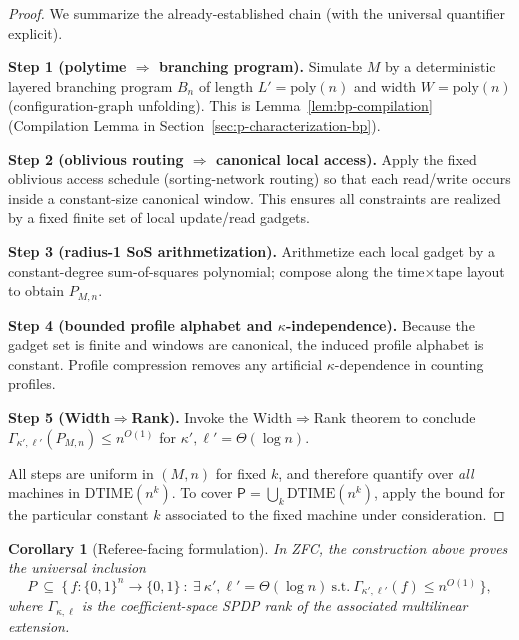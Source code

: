 \documentclass[12pt]{article}
\newcommand{\poly}{\mathrm{poly}}
\newtheorem{corollary}[theorem]{Corollary}
\theoremstyle{definition}
\theoremstyle{definition}
\theoremstyle{remark}
\theoremstyle{remark}
\begin{document}
\begin{proof}
We summarize the already-established chain (with the universal quantifier explicit).

\textbf{Step 1 (polytime $\Rightarrow$ branching program).}
Simulate $M$ by a deterministic layered branching program $B_n$ of length $L'=\poly(n)$
and width $W=\poly(n)$ (configuration-graph unfolding). This is Lemma~\ref{lem:bp-compilation}
(Compilation Lemma in Section~\ref{sec:p-characterization-bp}).

\textbf{Step 2 (oblivious routing $\Rightarrow$ canonical local access).}
Apply the fixed oblivious access schedule (sorting-network routing) so that each read/write
occurs inside a constant-size canonical window. This ensures all constraints are realized
by a fixed finite set of local update/read gadgets.

\textbf{Step 3 (radius-1 SoS arithmetization).}
Arithmetize each local gadget by a constant-degree sum-of-squares polynomial; compose along
the time$\times$tape layout to obtain $P_{M,n}$.

\textbf{Step 4 (bounded profile alphabet and $\kappa$-independence).}
Because the gadget set is finite and windows are canonical, the induced profile alphabet is
constant. Profile compression removes any artificial $\kappa$-dependence in counting profiles.

\textbf{Step 5 (Width$\Rightarrow$Rank).}
Invoke the Width$\Rightarrow$Rank theorem to conclude
$\Gamma_{\kappa',\ell'}(P_{M,n})\le n^{O(1)}$ for $\kappa',\ell'=\Theta(\log n)$.

All steps are uniform in $(M,n)$ for fixed $k$, and therefore quantify over \emph{all} machines in $\mathrm{DTIME}(n^k)$. To cover $\mathsf{P}=\bigcup_k\mathrm{DTIME}(n^k)$, apply the bound for the particular constant $k$ associated to the fixed machine under consideration.
\end{proof}

\begin{corollary}[Referee-facing formulation]
\label{cor:P-subset-polyspdp}
In ZFC, the construction above proves the universal inclusion
\[
P\ \subseteq\ \{\, f:\{0,1\}^n\to\{0,1\}\ :\ \exists\ \kappa',\ell'=\Theta(\log n)\ \text{s.t.}\
\Gamma_{\kappa',\ell'}(f)\le n^{O(1)} \,\},
\]
where $\Gamma_{\kappa,\ell}$ is the \emph{coefficient-space} SPDP rank of the associated
multilinear extension.
\end{corollary}

\end{document}
